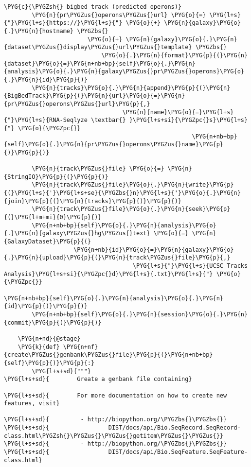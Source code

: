 \begin{Verbatim}[commandchars=\\\{\}]
        \PYG{c}{\PYGZsh{} bigbed track (predicted operons)}
        \PYG{n}{pr\PYGZus{}operons\PYGZus{}url} \PYG{o}{=} \PYG{l+s}{"}\PYG{l+s}{https://}\PYG{l+s}{"} \PYG{o}{+} \PYG{n}{galaxy}\PYG{o}{.}\PYG{n}{hostname} \PYGZbs{}
                        \PYG{o}{+} \PYG{n}{galaxy}\PYG{o}{.}\PYG{n}{dataset\PYGZus{}display\PYGZus{}url\PYGZus{}template} \PYGZbs{}
                            \PYG{o}{.}\PYG{n}{format}\PYG{p}{(}\PYG{n}{dataset}\PYG{o}{=}\PYG{n+nb+bp}{self}\PYG{o}{.}\PYG{n}{analysis}\PYG{o}{.}\PYG{n}{galaxy\PYGZus{}pr\PYGZus{}operons}\PYG{o}{.}\PYG{n}{id}\PYG{p}{)}
        \PYG{n}{tracks}\PYG{o}{.}\PYG{n}{append}\PYG{p}{(}\PYG{n}{BigBedTrack}\PYG{p}{(}\PYG{n}{url}\PYG{o}{=}\PYG{n}{pr\PYGZus{}operons\PYGZus{}url}\PYG{p}{,}
                                  \PYG{n}{name}\PYG{o}{=}\PYG{l+s}{"}\PYG{l+s}{RNA-Seqlyze \textbar{} }\PYG{l+s+si}{\PYGZpc{}s}\PYG{l+s}{"} \PYG{o}{\PYGZpc{}}
                                                      \PYG{n+nb+bp}{self}\PYG{o}{.}\PYG{n}{pr\PYGZus{}operons\PYGZus{}name}\PYG{p}{)}\PYG{p}{)}

        \PYG{n}{track\PYGZus{}file} \PYG{o}{=} \PYG{n}{StringIO}\PYG{p}{(}\PYG{p}{)}
        \PYG{n}{track\PYGZus{}file}\PYG{o}{.}\PYG{n}{write}\PYG{p}{(}\PYG{l+s}{'}\PYG{l+s+se}{\PYGZbs{}n}\PYG{l+s}{'}\PYG{o}{.}\PYG{n}{join}\PYG{p}{(}\PYG{n}{tracks}\PYG{p}{)}\PYG{p}{)}
        \PYG{n}{track\PYGZus{}file}\PYG{o}{.}\PYG{n}{seek}\PYG{p}{(}\PYG{l+m+mi}{0}\PYG{p}{)}
        \PYG{n+nb+bp}{self}\PYG{o}{.}\PYG{n}{analysis}\PYG{o}{.}\PYG{n}{galaxy\PYGZus{}hg\PYGZus{}text} \PYG{o}{=} \PYG{n}{GalaxyDataset}\PYG{p}{(}
                    \PYG{n+nb}{id}\PYG{o}{=}\PYG{n}{galaxy}\PYG{o}{.}\PYG{n}{upload}\PYG{p}{(}\PYG{n}{track\PYGZus{}file}\PYG{p}{,}
                                     \PYG{l+s}{"}\PYG{l+s}{UCSC Tracks Analysis}\PYG{l+s+si}{\PYGZpc{}d}\PYG{l+s}{.txt}\PYG{l+s}{"} \PYG{o}{\PYGZpc{}}
                                                          \PYG{n+nb+bp}{self}\PYG{o}{.}\PYG{n}{analysis}\PYG{o}{.}\PYG{n}{id}\PYG{p}{)}\PYG{p}{)}
        \PYG{n+nb+bp}{self}\PYG{o}{.}\PYG{n}{session}\PYG{o}{.}\PYG{n}{commit}\PYG{p}{(}\PYG{p}{)}

    \PYG{n+nd}{@stage}
    \PYG{k}{def} \PYG{n+nf}{create\PYGZus{}genbank\PYGZus{}file}\PYG{p}{(}\PYG{n+nb+bp}{self}\PYG{p}{)}\PYG{p}{:}
        \PYG{l+s+sd}{"""}
\PYG{l+s+sd}{        Greate a genbank file containing}

\PYG{l+s+sd}{        For more documentation on how to create new features, visit}

\PYG{l+s+sd}{         - http://biopython.org/\PYGZbs{}\PYGZbs{}}
\PYG{l+s+sd}{                 DIST/docs/api/Bio.SeqRecord.SeqRecord-class.html\PYGZsh{}\PYGZus{}\PYGZus{}getitem\PYGZus{}\PYGZus{}}
\PYG{l+s+sd}{         - http://biopython.org/\PYGZbs{}\PYGZbs{}}
\PYG{l+s+sd}{                 DIST/docs/api/Bio.SeqFeature.SeqFeature-class.html}


\end{Verbatim}
